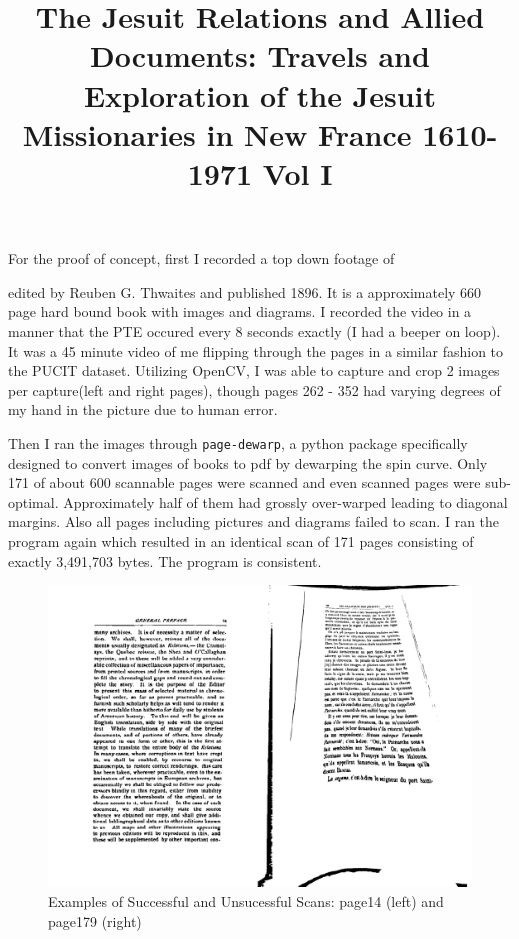 \documentclass[10pt,twocolumn]{article}
\begin{document}
For the proof of concept, first I recorded a top down footage of \title{The Jesuit Relations and Allied Documents: Travels and Exploration of the Jesuit Missionaries in New France 1610-1971 Vol I} edited by Reuben G. Thwaites and published 1896. It is a approximately 660 page hard bound book with images and diagrams. I recorded the video in a manner that the PTE occured every 8 seconds exactly (I had a beeper on loop). It was a 45 minute video of me flipping through the pages in a similar fashion to the PUCIT dataset. Utilizing OpenCV, I was able to capture and crop 2 images per capture(left and right pages), though pages 262 - 352 had varying degrees of my hand in the picture due to human error.\newline

Then I ran the images through \texttt{page-dewarp}, a python package specifically designed to convert images of books to pdf by dewarping the spin curve. Only 171 of about 600 scannable pages were scanned and even scanned pages were sub-optimal. Approximately half of them had grossly over-warped leading to diagonal margins. Also all pages including pictures and diagrams failed to scan. I ran the program again which resulted in an identical scan of 171 pages consisting of exactly 3,491,703 bytes. The program is consistent.\newline

\begin{figure}
    \centering
    \includegraphics[width=1\linewidth]{scan.png}
    \caption{Examples of Successful and Unsucessful Scans: page14 (left) and page179 (right)}
    \label{fig:enter-label}
\end{figure}
\end{document}
